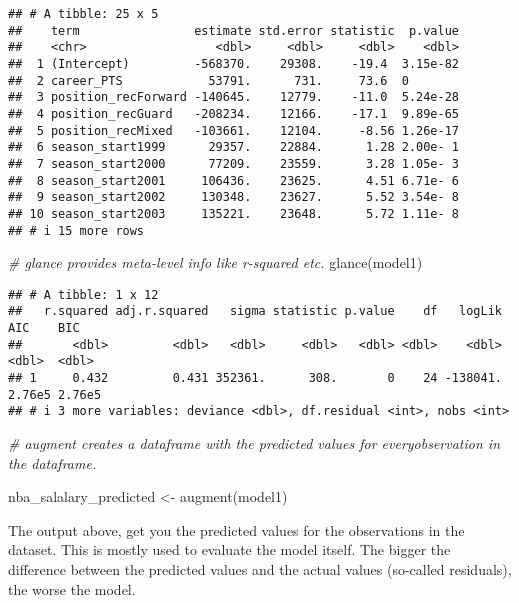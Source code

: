 \documentclass[
]{book}
\newenvironment{Shaded}{\begin{snugshade}}{\end{snugshade}}
\newcommand{\CommentTok}[1]{\textcolor[rgb]{0.56,0.35,0.01}{\textit{#1}}}
\newcommand{\FunctionTok}[1]{\textcolor[rgb]{0.00,0.00,0.00}{#1}}
\newcommand{\NormalTok}[1]{#1}
\newcommand{\OtherTok}[1]{\textcolor[rgb]{0.56,0.35,0.01}{#1}}
\begin{document}
\begin{verbatim}
## # A tibble: 25 x 5
##    term                estimate std.error statistic  p.value
##    <chr>                  <dbl>     <dbl>     <dbl>    <dbl>
##  1 (Intercept)         -568370.    29308.    -19.4  3.15e-82
##  2 career_PTS            53791.      731.     73.6  0       
##  3 position_recForward -140645.    12779.    -11.0  5.24e-28
##  4 position_recGuard   -208234.    12166.    -17.1  9.89e-65
##  5 position_recMixed   -103661.    12104.     -8.56 1.26e-17
##  6 season_start1999      29357.    22884.      1.28 2.00e- 1
##  7 season_start2000      77209.    23559.      3.28 1.05e- 3
##  8 season_start2001     106436.    23625.      4.51 6.71e- 6
##  9 season_start2002     130348.    23627.      5.52 3.54e- 8
## 10 season_start2003     135221.    23648.      5.72 1.11e- 8
## # i 15 more rows
\end{verbatim}

\begin{Shaded}
\begin{Highlighting}[]
\CommentTok{\# glance provides meta{-}level info like r{-}squared etc.}
\FunctionTok{glance}\NormalTok{(model1)}
\end{Highlighting}
\end{Shaded}

\begin{verbatim}
## # A tibble: 1 x 12
##   r.squared adj.r.squared   sigma statistic p.value    df   logLik    AIC    BIC
##       <dbl>         <dbl>   <dbl>     <dbl>   <dbl> <dbl>    <dbl>  <dbl>  <dbl>
## 1     0.432         0.431 352361.      308.       0    24 -138041. 2.76e5 2.76e5
## # i 3 more variables: deviance <dbl>, df.residual <int>, nobs <int>
\end{verbatim}

\begin{Shaded}
\begin{Highlighting}[]
\CommentTok{\# augment creates a dataframe with the predicted values for everyobservation in the dataframe. }

\NormalTok{nba\_salalary\_predicted }\OtherTok{\textless{}{-}} \FunctionTok{augment}\NormalTok{(model1)}
\end{Highlighting}
\end{Shaded}

The output above, get you the predicted values for the observations in the dataset. This is mostly used to evaluate the model itself. The bigger the difference between the predicted values and the actual values (so-called residuals), the worse the model.
\end{document}
